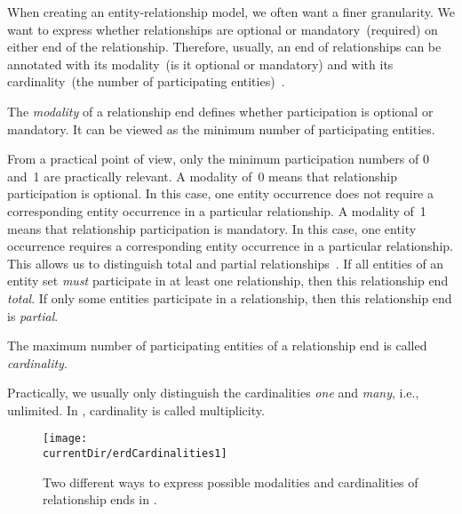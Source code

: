 When creating an entity-relationship model, we often want a finer granularity.
We want to express whether relationships are optional or mandatory~(required) on either end of the relationship.
Therefore, usually, an end of relationships can be annotated with its modality~(is it optional or mandatory) and with its cardinality~(the number of participating entities)~\cite{R2024CDS:E}.
%
\begin{definition}
The \emph{modality} of a relationship end defines whether participation is optional or mandatory. %
It can be viewed as the minimum number of participating entities.%
\end{definition}%
%
From a practical point of view, only the minimum participation numbers of 0 and~1 are practically relevant.
A modality of~0 means that relationship participation is optional.
In this case, one entity occurrence does not require a corresponding entity occurrence in a particular relationship.
A modality of~1 means that relationship participation is mandatory.
In this case, one entity occurrence requires a corresponding entity occurrence in a particular relationship.
This allows us to distinguish total and partial relationships~\cite{P2006CITRD:ERMI,V1999C5DMS:CDUTERM}.
If all entities of an entity set \emph{must} participate in at least one relationship, then this relationship end \emph{total}.
If only some entities participate in a relationship, then this relationship end is \emph{partial}.
%
\begin{definition}
The maximum number of participating entities of a relationship end is called \emph{cardinality}.%
\end{definition}%
%
Practically, we usually only distinguish the cardinalities \emph{one} and \emph{many}, i.e., unlimited.%
In , cardinality is called multiplicity.

\begin{figure}%
\centering%
\texttt{[image: \\currentDir/erdCardinalities1]}%
\caption{Two different ways to express possible modalities and cardinalities of relationship ends in .}%
\label{fig:erdCardinalities1}%
\end{figure}%


